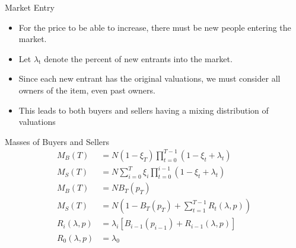 \documentclass[bigger]{beamer}
\begin{document}
\begin{frame}[label=sec-1-26]{Market Entry}
\begin{itemize}
\item For the price to be able to increase, there must be new people
entering the market.
\item Let $\lambda$$_{\text{t}}$ denote the percent of new entrants into the market.
\item Since each new entrant has the original valuations, we must consider
all owners of the item, even past owners.
\item This leads to both buyers and sellers having a mixing distribution
of valuations
\end{itemize}
\end{frame}

\begin{frame}[label=sec-1-27]{Masses of Buyers and Sellers}
\begin{align*}
M_B(T) &= N (1-\xi_T ) \prod_{t=0}^{T-1} ( 1 - \xi_t + \lambda_t ) \\
M_S(T) &= N \sum_{i = 0}^T \xi_i \prod_{t=0}^{i-1} ( 1- \xi_t + \lambda_t )\\
M_B(T) &= N B_T ( p_T )\\
M_S(T) &= N \left ( 1 - B_T(p_T) + \sum_{t=1}^{T-1}  R_{t}(\lambda,p) \right )\\
R_i(\lambda,p) &= \lambda_i \left [ B_{i-1}(p_{i-1} ) + R_{i-1}(\lambda, p) \right ]\\
R_0 (\lambda,p) &= \lambda_0 \\
\end{align*}
\end{frame}
\end{document}
